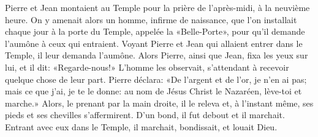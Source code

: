 Pierre et Jean montaient au Temple pour la prière de l’après-midi, à la neuvième heure.
On y amenait alors un homme, infirme de naissance,
	que l’on installait chaque jour à la porte du Temple, appelée la «Belle-Porte»,
	pour qu’il demande l’aumône à ceux qui entraient.
Voyant Pierre et Jean qui allaient entrer dans le Temple,
	il leur demanda l’aumône.
Alors Pierre, ainsi que Jean, fixa les yeux sur lui, et il dit:
	«Regarde-nous!»
	L’homme les observait, s’attendant à recevoir quelque chose de leur part.
Pierre déclara: «De l’argent et de l’or, je n’en ai pas;
	mais ce que j’ai, je te le donne:
	au nom de Jésus Christ le Nazaréen, lève-toi et marche.»
Alors, le prenant par la main droite, il le releva
	et, à l’instant même, ses pieds et ses chevilles s’affermirent.
	D’un bond, il fut debout et il marchait.
Entrant avec eux dans le Temple, il marchait, bondissait, et louait Dieu.
